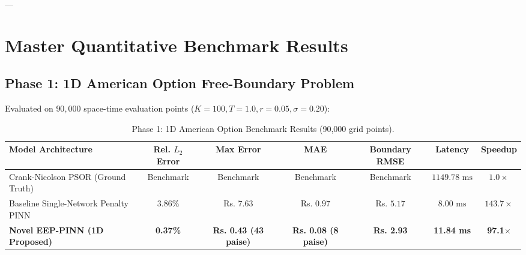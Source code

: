 \documentclass[11pt,a4paper]{article}
\begin{document}
---

\section{Master Quantitative Benchmark Results}

\subsection{Phase 1: 1D American Option Free-Boundary Problem}
Evaluated on $90,000$ space-time evaluation points ($K=100, T=1.0, r=0.05, \sigma=0.20$):

\begin{table}[htbp]
\centering
\small
\caption{Phase 1: 1D American Option Benchmark Results (90,000 grid points).}
\begin{tabularx}{\textwidth}{@{}l c c c c c c@{}}
\toprule
\textbf{Model Architecture} & \textbf{Rel. $L_2$ Error} & \textbf{Max Error} & \textbf{MAE} & \textbf{Boundary RMSE} & \textbf{Latency} & \textbf{Speedup} \\ \midrule
Crank-Nicolson PSOR (Ground Truth) & Benchmark & Benchmark & Benchmark & Benchmark & $1149.78\text{ ms}$ & $1.0\times$ \\
Baseline Single-Network Penalty PINN & $3.86\%$ & Rs. $7.63$ & Rs. $0.97$ & Rs. $5.17$ & $8.00\text{ ms}$ & $143.7\times$ \\
\textbf{Novel EEP-PINN (1D Proposed)} & \textbf{0.37\%} & \textbf{Rs. 0.43 (43 paise)} & \textbf{Rs. 0.08 (8 paise)} & \textbf{Rs. 2.93} & \textbf{11.84 ms} & \textbf{97.1$\times$} \\ \bottomrule
\end{tabularx}
\end{table}
\end{document}

